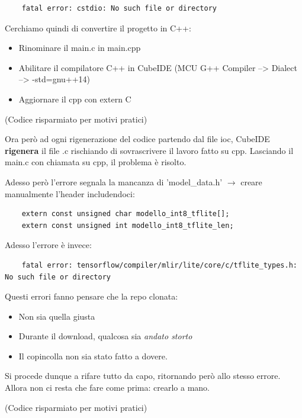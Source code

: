 \begin{verbatim}
    fatal error: cstdio: No such file or directory
\end{verbatim}

Cerchiamo quindi di convertire il progetto in C++: 
\begin{itemize}
    \item Rinominare il main.c in main.cpp
    \item Abilitare il compilatore C++ in CubeIDE (MCU G++ Compiler --> Dialect --> -std=gnu++14)
    \item Aggiornare il cpp con extern C{}
\end{itemize}

\begin{center}
    (Codice risparmiato per motivi pratici)
\end{center}

Ora però ad ogni rigenerazione del codice partendo dal file ioc, CubeIDE \textbf{rigenera} il file .c rischiando di sovrascrivere il lavoro fatto su cpp. Lasciando il main.c con chiamata su cpp, il problema è risolto.

Adesso però l'errore segnala la mancanza di 'model_data.h' $\rightarrow$ creare manualmente l'header includendoci:

\begin{verbatim}
    extern const unsigned char modello_int8_tflite[]; 
    extern const unsigned int modello_int8_tflite_len;
\end{verbatim}

Adesso l'errore è invece:

\begin{verbatim}
    fatal error: tensorflow/compiler/mlir/lite/core/c/tflite_types.h: No such file or directory
\end{verbatim}

Questi errori fanno pensare che la repo clonata:
\begin{itemize}
    \item Non sia quella giusta
    \item Durante il download, qualcosa sia \textit{andato storto}
    \item Il copincolla non sia stato fatto a dovere.
\end{itemize}
Si procede dunque a rifare tutto da capo, ritornando però allo stesso errore. Allora non ci resta che fare come prima: crearlo a mano.

\begin{center}
    (Codice risparmiato per motivi pratici)
\end{center}


